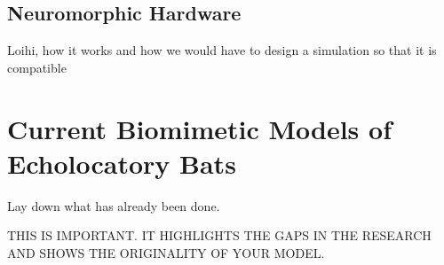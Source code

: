 \subsection{Neuromorphic Hardware}

Loihi, how it works and how we would have to design a simulation so that it is compatible

\section{Current Biomimetic Models of Echolocatory Bats}

Lay down what has already been done. 

THIS IS IMPORTANT. IT HIGHLIGHTS THE GAPS IN THE RESEARCH AND SHOWS THE ORIGINALITY OF YOUR MODEL.













